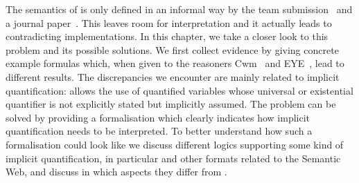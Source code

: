 









The semantics of \nthreelogic is only defined in an informal way by the \wwwc team submission~\cite{Notation3} and a journal paper~\cite{N3Logic}. 
This leaves room for interpretation and it actually leads to contradicting implementations. 
In this chapter, we take a closer look to this problem and its possible solutions. %
We first collect evidence %
by giving concrete example formulas which, when given to the reasoners Cwm~\cite{cwm} and EYE~\cite{eye}, lead to different results. 
The discrepancies we encounter are mainly related to 
implicit quantification: \nthree allows the use of quantified variables whose universal or existential quantifier is not explicitly stated but implicitly assumed.
The problem can be solved by providing a formalisation which clearly indicates how implicit quantification needs to be interpreted. To better understand how such a formalisation 
could look like we discuss different logics supporting some kind of implicit quantification, in particular \rdf and other formats related to the Semantic Web, and discuss
in which aspects they differ 
from \nthree.

% 


